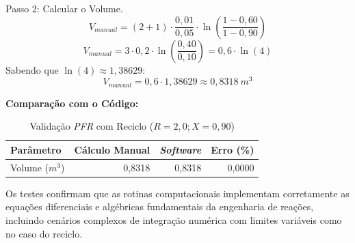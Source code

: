 Passo 2: Calcular o Volume.
\begin{equation}
    V_{manual} = (2 + 1) \cdot \frac{0,01}{0,05} \cdot \ln\left( \frac{1 - 0,60}{1 - 0,90} \right)
    \label{eq:val_recycle_vol_calc_1}
\end{equation}
\begin{equation}
    V_{manual} = 3 \cdot 0,2 \cdot \ln\left( \frac{0,40}{0,10} \right) = 0,6 \cdot \ln(4)
    \label{eq:val_recycle_vol_calc_2}
\end{equation}
Sabendo que $\ln(4) \approx 1,38629$:
\begin{equation}
    V_{manual} = 0,6 \cdot 1,38629 \approx 0,8318 \ m^3
    \label{eq:val_recycle_vol_calc_3}
\end{equation}

\textbf{Comparação com o Código:}
\begin{table}[H]
    \centering
    \caption{Validação \textit{PFR} com Reciclo ($R=2,0; X=0,90$)}
    \begin{tabular}{lrrr}
        \toprule
        \textbf{Parâmetro} & \textbf{Cálculo Manual} & \textbf{\textit{Software}} & \textbf{Erro (\%)} \\
        \midrule
        Volume ($m^3$) & 0,8318 & 0,8318 & 0,0000 \\
        \bottomrule
    \end{tabular}
\end{table}

Os testes confirmam que as rotinas computacionais implementam corretamente as equações diferenciais e algébricas fundamentais da engenharia de reações, incluindo cenários complexos de integração numérica com limites variáveis como no caso do reciclo.
